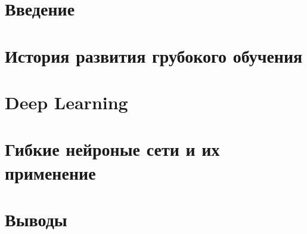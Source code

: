 \documentclass[a4paper, 14pt]{article}
\begin{document}
    


    \section*{Введение}    
    

    \section*{История развития грубокого обучения}
    

    \section*{Deep Learning}
    

    \section*{Гибкие нейроные сети и их применение}
    

    \section*{Выводы}
    
\end{document}
